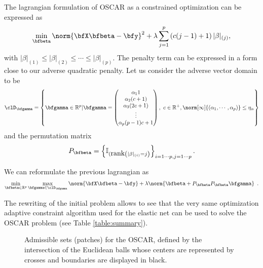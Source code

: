 The lagrangian formulation of  OSCAR as a constrained optimization can be expressed as
$$
 \min_{\bfbeta}     \norm{\bfX  \bfbeta  - \bfy  }^2+\lambda \sum_{j=1}^p \left( c(j-1)+1 \right) |\beta|_{(j)},
$$
with $|\beta|_{(1)}\leq |\beta|_{(2)} \leq \cdots \leq |\beta|_{(p)}$. The penalty term can be expressed in a form close to our adverse quadratic penalty. Let us consider  the adverse vector domain to be
$$
 \clD_{\bfgamma}=\left\{ \bfgamma \in \mathbb{R}^p | \bfgamma= 
\begin{pmatrix}
\alpha_1 1\\
\alpha_2 (c+1) \\
\alpha_3 (2c+1) \\
\vdots \\
\alpha_p (p-1) c+1
\end{pmatrix}, \ c\in \mathbb{R}^+ , 
\norm[\infty]{(\alpha_1,\cdots,\alpha_p)} \leq \eta_\alpha \right\}
$$
and the permutation matrix
$$
 P_{\bfbeta} = \left\{ \mathbb{I}_{(\mbox{rank}\left( |\beta|_{(i)}=j \right)} \right\}_{i = 1 \cdots p, j=1 \cdots p}.
$$

We can reformulate the previous lagrangian as 
\begin{equation*}
    \min_{\bfbeta\in\mathbb{R}^p} \max_{\bfgamma \in \clD_{\bfgamma}}
    \norm{\bfX \bfbeta - \bfy } + \lambda \norm{\bfbeta +
    P_{\bfbeta}   P_{\bfbeta}  \bfgamma } \enspace.
\end{equation*}



The rewriting of the initial problem  allows to see that the very same
optimization adaptive  constraint algorithm  used for the  elastic net
can be used to solve the OSCAR problem (see Table \ref{table:summary}).


\begin{figure}
  \begin{center} 
    \caption{Admissible sets (patches) for the OSCAR, defined by the
      intersection of the Euclidean balls whose centers are represented by
      crosses and boundaries are
      displayed in black.}
    \label{fig:oscar-penalty}
    \end{center} 
\end{figure}

